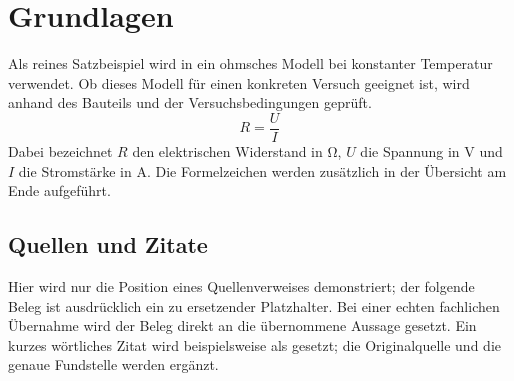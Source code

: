 \chapter{Grundlagen}
\label{chap:theory}

Als reines Satzbeispiel wird in  ein ohmsches Modell bei
konstanter Temperatur verwendet. Ob dieses Modell für einen konkreten
Versuch geeignet ist, wird anhand des Bauteils und der Versuchsbedingungen
geprüft.
\begin{equation}
  R = \frac{U}{I}
  \label{eq:ohm}
\end{equation}
Dabei bezeichnet $R$ den elektrischen Widerstand in \unit{\ohm}, $U$ die
Spannung in \unit{\volt} und $I$ die Stromstärke in \unit{\ampere}.
Die Formelzeichen werden zusätzlich in der Übersicht am Ende aufgeführt.

\section{Quellen und Zitate}
Hier wird nur die Position eines Quellenverweises demonstriert; der
folgende Beleg ist ausdrücklich ein zu ersetzender Platzhalter.
Bei einer echten fachlichen Übernahme wird der Beleg direkt an die
übernommene Aussage gesetzt. Ein kurzes wörtliches Zitat wird beispielsweise
als  gesetzt; die
Originalquelle und die genaue Fundstelle werden ergänzt.
